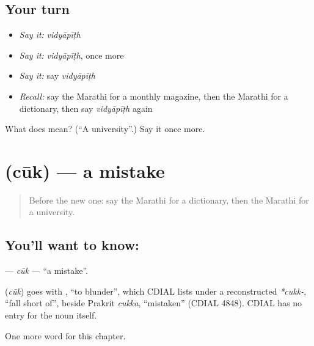 \subsection*{Your turn}
\begin{itemize}
\raggedright
  \item \emph{Say it:} \emph{vidyāpīṭh}
  \item \emph{Say it:} \emph{vidyāpīṭh}, once more
  \item \emph{Say it:} say \emph{vidyāpīṭh}
  \item \emph{Recall:} say the Marathi for a monthly magazine, then the Marathi for a dictionary, then say \emph{vidyāpīṭh} again
\end{itemize}

\begin{tcolorbox}[breakable,colback=teal!4,colframe=teal!35!black,title={Before you move on}]
What does  mean? (\textquotedblleft{}A university\textquotedblright{}.) Say it once more.
\end{tcolorbox}
\section[\texorpdfstring{\mr{चूक} (cūk)}{चूक (cūk)}]{ (cūk) — a mistake}

\label{lesson:MR-C222-cuk}



\begin{quote}
Before the new one: say the Marathi for a dictionary, then the Marathi for a university.
\end{quote}

\subsection*{You'll want to know: }
\textbf{} — \emph{cūk} — \textquotedblleft{}a mistake\textquotedblright{}.

\begin{cousinweb}
\textbf{} (\emph{cūk}) goes with \textbf{}, \textquotedblleft{}to blunder\textquotedblright{}, which CDIAL lists under a reconstructed \emph{*cukk-}, \textquotedblleft{}fall short of\textquotedblright{}, beside Prakrit \emph{cukka}, \textquotedblleft{}mistaken\textquotedblright{} (CDIAL 4848). CDIAL has no entry for the noun itself.
\end{cousinweb}

\begin{grammarlens}[title={What you've built}]
One more word for this chapter.
\end{grammarlens}


